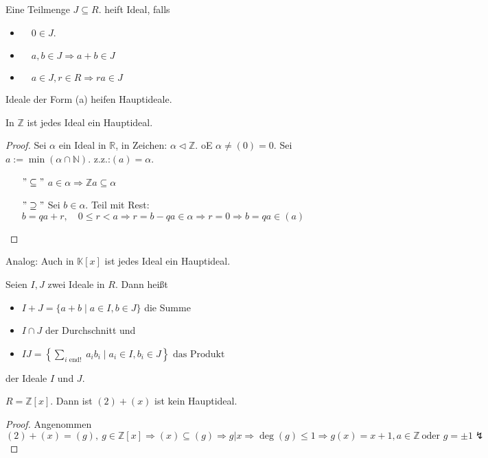 \begin{definition}
    Eine Teilmenge $J \subseteq R$. heift Ideal, falls
    \begin{itemize}
        \item $\quad 0 \in J$.
        \item $\quad a, b \in J \Longrightarrow a+b \in J$
        \item $\quad a \in J, r \in R \Longrightarrow r a \in J$

    \end{itemize}\end{definition}
Ideale der Form (a) heifen Hauptideale.
\begin{example}
    In \(\mathbb{Z}\) ist jedes Ideal ein Hauptideal.
\end{example}
\begin{proof}
    Sei \(\alpha\) ein Ideal in \(\mathbb{R}\), in Zeichen: \(\alpha\triangleleft \mathbb{Z}\). oE \(\alpha\not = (0)={0}\). Sei \(a:=\min(\alpha\cap \mathbb{N})\). z.z.:\((a) = \alpha\).\begin{itemize}
        \item[\("\subseteq"\)] \(a\in \alpha \Rightarrow \mathbb{Z}a \subseteq \alpha\)
        \item[\("\supseteq"\)] Sei \(b\in \alpha\). Teil mit Rest: \(b=qa+r,\quad 0\leq r < a\Rightarrow r = b -qa \in \alpha\Rightarrow r =0\Rightarrow b =qa \in (a)\)
    \end{itemize}
\end{proof}
Analog: Auch in \(\mathbb{K}[x]\) ist jedes Ideal ein Hauptideal.

\begin{definition}
    Seien $I, J$ zwei Ideale in $R .$ Dann heißt
    \begin{itemize}
        \item     $I+J=\{a+b \mid a \in I, b \in J\}$ die Summe
        \item    $I \cap J$ der Durchschnitt und
        \item    $    I J=\left\{\sum_{i \text { end! }} a_{i} b_{i} \mid a_{i} \in I, b_{i} \in J\right\} \text { das Produkt }$

    \end{itemize}    der Ideale $I$ und $J$.
\end{definition}
\begin{example}
    \(R=\mathbb{Z}[x]\). Dann ist \((2) + (x) \) ist kein Hauptideal.
\end{example}
\begin{proof}
    Angenommen \((2)+(x) = (g),\ g\in \mathbb{Z}[x]\Rightarrow (x)\subseteq (g)\Rightarrow g|x\Rightarrow \deg(g)\leq 1\Rightarrow g(x)=x+1,a\in\mathbb{Z}\ \text{oder } g=\pm 1\lightning\)    
\end{proof}

